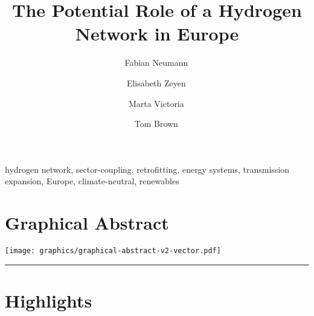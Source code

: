 \documentclass[11pt,preprint]{elsarticle}
\begin{document}
\begin{frontmatter}

	\title{The Potential Role of a Hydrogen Network in Europe}

	\author[tubaddress]{Fabian Neumann\,}
	\author[tubaddress]{Elisabeth Zeyen\,}
	\author[aarhus,aarhus2]{Marta Victoria\,}
	\author[tubaddress]{Tom Brown\,}
	\address[tubaddress]{Department of Digital Transformation in Energy Systems, Institute of Energy Technology, Technische Universität Berlin, Fakultät III, Einsteinufer 25 (TA 8), 10587 Berlin, Germany}
	\address[aarhus]{Department of Mechanical and Production Engineering, Aarhus University, Inge Lehmanns Gade 10, 8000 Aarhus, Denmark}
	\address[aarhus2]{Novo Nordisk Foundation CO$_2$ Research Center, Aarhus University, Aarhus, Denmark}

	\begin{abstract}
		
	\end{abstract}

	\begin{keyword}
		hydrogen network, sector-coupling, retrofitting, energy systems, transmission expansion, Europe, climate-neutral, renewables
	\end{keyword}


\end{frontmatter}

\section*{Graphical Abstract}


\texttt{[image: graphics/graphical-abstract-v2-vector.pdf]}

\newpage
\par\noindent\rule{\textwidth}{0.4pt}

\section*{Highlights}
\end{document}

